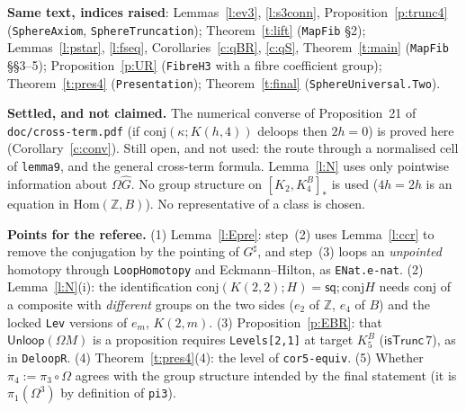 \documentclass[11pt]{amsart}
\theoremstyle{definition}
\theoremstyle{remark}
\newcommand{\Om}{\Omega}
\newcommand{\Z}{\mathbb{Z}}
\newcommand{\code}[1]{\texttt{#1}}
\newcommand{\cT}{\mathsf{isTrunc}}
\newcommand{\lp}{\Omega}
\newcommand{\Hom}{\mathrm{Hom}}
\newcommand{\hc}[2]{[#1,#2]_*}
\newcommand{\sq}{\mathsf{sq}}
\newcommand{\Unl}{\mathsf{Unloop}}
\newcommand{\cj}{\mathrm{conj}}
\begin{document}
\noindent\textbf{Same text, indices raised}: Lemmas~\ref{l:ev3}, \ref{l:s3conn},
Proposition~\ref{p:trunc4} (\code{SphereAxiom}, \code{SphereTruncation});
Theorem~\ref{t:lift} (\code{MapFib} \S2); Lemmas~\ref{l:pstar}, \ref{l:fseq},
Corollaries~\ref{c:qBR}, \ref{c:qS}, Theorem~\ref{t:main} (\code{MapFib}
\S\S3--5); Proposition~\ref{p:UR} (\code{FibreH3} with a fibre coefficient
group); Theorem~\ref{t:pres4} (\code{Presentation}); Theorem~\ref{t:final}
(\code{SphereUniversal.Two}).

\noindent\textbf{Settled, and not claimed.} The numerical converse of
Proposition~21 of \code{doc/cross-term.pdf} (if $\cj(\kappa;K(h,4))$ deloops then
$2h=0$) is proved here (Corollary~\ref{c:conv}). Still open, and not used: the
route through a normalised cell of \code{lemma9}, and the general cross-term
formula. Lemma~\ref{l:N} uses only pointwise information about $\lp\hat G$. No group structure on $\hc{K_2}{K^B_4}$ is used
($4h=2h$ is an equation in $\Hom(\Z,B)$). No representative of a class is
chosen.

\noindent\textbf{Points for the referee.} (1) Lemma~\ref{l:Epre}: step~(2)
uses Lemma~\ref{l:ccr} to remove the conjugation by the pointing of $G^\sharp$,
and step~(3) loops an \emph{unpointed} homotopy through \code{LoopHomotopy} and
Eckmann--Hilton, as \code{ENat.e-nat}. (2) Lemma~\ref{l:N}(i): the identification $\cj(K(2,2);H)=\sq;\cj H$
needs $\cj$ of a composite with \emph{different} groups on the two sides
($e_2$ of $\Z$, $e_4$ of $B$) and the locked \code{Lev} versions of $e_m$,
$K(2,m)$. (3) Proposition~\ref{p:EBR}: that $\Unl(\lp M)$ is a proposition
requires \code{Levels[2,1]} at target $K^B_5$ ($\cT\,7$), as in \code{DeloopR}.
(4) Theorem~\ref{t:pres4}(4): the level of \code{cor5-equiv}. (5) Whether
$\pi_4:=\pi_3\circ\Om$ agrees with the group structure intended by the final
statement (it is $\pi_1(\Om^3)$ by definition of \code{pi3}).
\end{document}

